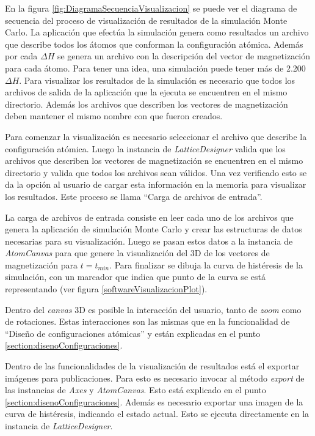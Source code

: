 En la figura \ref{fig:DiagramaSecuenciaVisualizacion} se puede ver el diagrama de secuencia del proceso de visualización de resultados de la simulación Monte Carlo. La aplicación que efectúa la simulación genera como resultados un archivo que describe todos los átomos que conforman la configuración atómica. Además por cada $\Delta H$ se genera un archivo con la descripción del vector de magnetización para cada átomo. Para tener una idea, una simulación puede tener más de 2.200 $\Delta H$. Para visualizar los resultados de la simulación es necesario que todos los archivos de salida de la aplicación que la ejecuta se encuentren en el mismo directorio. Además los archivos que describen los vectores de magnetización deben mantener el mismo nombre con que fueron creados.

Para comenzar la visualización es necesario seleccionar el archivo que describe la configuración atómica. Luego la instancia de \emph{LatticeDesigner} valida que los archivos que describen los vectores de magnetización se encuentren en el mismo directorio y valida que todos los archivos sean válidos. Una vez verificado esto se da la opción al usuario de cargar esta información en la memoria para visualizar los resultados. Este proceso se llama ``Carga de archivos de entrada''.

La carga de archivos de entrada consiste en leer cada uno de los archivos que genera la aplicación de simulación Monte Carlo y crear las estructuras de datos necesarias para su visualización. Luego se pasan estos datos a la instancia de \emph{AtomCanvas} para que genere la visualización del 3D de los vectores de magnetización para $t = t_{min}$. Para finalizar se dibuja la curva de histéresis de la simulación, con un marcador que indica que punto de la curva se está representando (ver figura \ref{softwareVisualizacionPlot}).

Dentro del \emph{canvas} 3D es posible la interacción del usuario, tanto de \emph{zoom} como de rotaciones. Estas interacciones son las mismas que en la funcionalidad de ``Diseño de configuraciones atómicas'' y están explicadas en el punto \ref{section:disenoConfiguraciones}.

Dentro de las funcionalidades de la visualización de resultados está el exportar imágenes para publicaciones. Para esto es necesario invocar al método \emph{export} de las instancias de \emph{Axes} y \emph{AtomCanvas}. Esto está explicado en el punto \ref{section:disenoConfiguraciones}. Además es necesario exportar una imagen de la curva de histéresis, indicando el estado actual. Esto se ejecuta directamente en la instancia de \emph{LatticeDesigner}.

